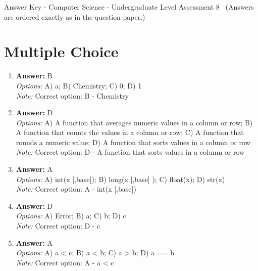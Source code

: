 \documentclass[12pt]{article}
\begin{document}
\begin{center}
Answer Key - Computer Science - Undergraduate Level Assessment 8 \
\small (Answers are ordered exactly as in the question paper.)
\end{center}

\section*{Multiple Choice}
\begin{enumerate}[label=\arabic*.]
\item \textbf{Answer:} B
\\ \textit{Options:} A) a; B) Chemistry; C) 0; D) 1
\\ \textit{Note:} Correct option: B - Chemistry
\item \textbf{Answer:} D
\\ \textit{Options:} A) A function that averages numeric values in a column or row; B) A function that counts the values in a column or row; C) A function that rounds a numeric value; D) A function that sorts values in a column or row
\\ \textit{Note:} Correct option: D - A function that sorts values in a column or row
\item \textbf{Answer:} A
\\ \textit{Options:} A) int(x [,base]); B) long(x [,base] ); C) float(x); D) str(x)
\\ \textit{Note:} Correct option: A - int(x [,base])
\item \textbf{Answer:} D
\\ \textit{Options:} A) Error; B) a; C) b; D) c
\\ \textit{Note:} Correct option: D - c
\item \textbf{Answer:} A
\\ \textit{Options:} A) a \textless{} c; B) a \textless{} b; C) a \textgreater{} b; D) a == b
\\ \textit{Note:} Correct option: A - a \textless{} c
\end{enumerate}
\end{document}
